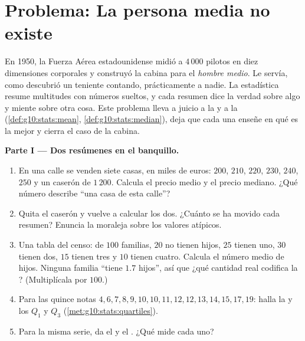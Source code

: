 \section{Problema: La persona media no existe}

\begin{problem}
\label{pb:g10:stats:1}
En 1950, la Fuerza Aérea estadounidense midió a $4\,000$ pilotos en diez
dimensiones corporales y construyó la cabina para el \emph{hombre medio}.
Le servía, como descubrió un teniente contando, prácticamente a nadie. La
estadística resume multitudes con números sueltos, y cada resumen dice la
verdad sobre algo y miente sobre otra cosa. Este problema lleva a juicio a
la  y a la  (\cref{def:g10:stats:mean},
\cref{def:g10:stats:median}), deja que cada una enseñe en qué es la mejor
y cierra el caso de la cabina.

\medskip
\noindent\textbf{Parte I --- Dos resúmenes en el banquillo.}
\begin{enumerate}
  \item En una calle se venden siete casas, en miles de euros: $200$,
        $210$, $220$, $230$, $240$, $250$ y un caserón de $1\,200$.
        Calcula el precio medio y el precio mediano. ¿Qué número describe
        ``una casa de esta calle''?
  \item Quita el caserón y vuelve a calcular los dos. ¿Cuánto se ha movido
        cada resumen? Enuncia la moraleja sobre los valores atípicos.
  \item Una tabla del censo: de $100$ familias, $20$ no tienen hijos, $25$
        tienen uno, $30$ tienen dos, $15$ tienen tres y $10$ tienen
        cuatro. Calcula el número medio de hijos. Ninguna familia ``tiene
        $1.7$ hijos'', así que ¿qué cantidad real codifica la ?
        (Multiplícala por $100$.)
  \item Para las quince notas
        $4, 6, 7, 8, 9, 10, 10, 11, 12, 12, 13, 14, 15, 17, 19$: halla la
         y los  $Q_1$ y $Q_3$
        (\cref{met:g10:stats:quartiles}).
  \item Para la misma serie, da el  y el . ¿Qué mide cada uno?
\end{enumerate}


\end{problem}
